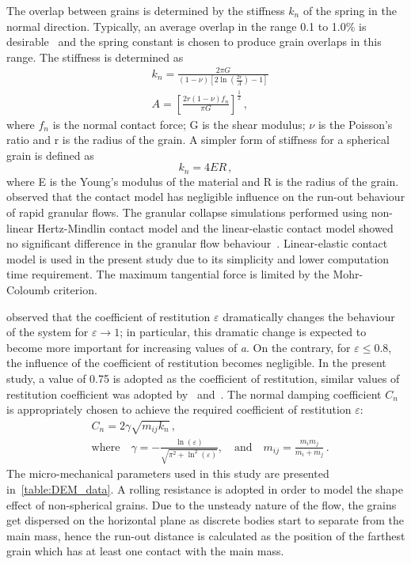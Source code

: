 The overlap between grains is determined by the stiffness 
$\textit{k}_{\textit{n}}$ of the spring in the normal direction. Typically, 
an average overlap in the range 0.1 to 1.0\% is desirable~\citep{Zenit2005} and 
the spring constant is chosen to produce grain overlaps in this range. The 
stiffness is determined as
\begin{align}
& \textit{k}_{\textit{n}}=\frac{2 \pi 
G}{(1-\nu)\left[2\ln(\frac{2r}{A})-1\right]} \\ 
& A = \left[\frac{2r(1-\nu)f_{n}}{\pi G}\right]^{\frac{1	}{2}}\,,
\end{align}
where $f_{n}$ is the normal contact force; G is the shear modulus; $\nu$ is the 
Poisson's ratio and r is the radius of the grain. A simpler form of stiffness 
for a spherical grain is defined as
\begin{equation}
\textit{k}_{\textit{n}}=4ER\,,
\end{equation}
where E is the Young's modulus of the material and R is the radius of the 
grain.~\citet{Cambou2009} observed that the contact model has negligible 
influence on the run-out behaviour of rapid granular flows. The granular 
collapse simulations performed using non-linear Hertz-Mindlin contact model and 
the linear-elastic contact model showed no significant difference in the 
granular flow behaviour~\citep{Utili2014}. Linear-elastic contact model is used 
in the present study due to its simplicity and lower computation time 
requirement. The maximum tangential force is limited by the Mohr-Coloumb 
criterion. 


\citet{Staron2007a} observed that the coefficient of restitution $\varepsilon$ 
dramatically changes the behaviour of the system for 
$\varepsilon\rightarrow 1$; in particular, this dramatic change is expected 
to become more important for increasing values of \textit{a}. On the contrary, 
for $\varepsilon \le 0.8$, the influence of the coefficient of restitution 
becomes 
negligible. In the present study, a value of 0.75 is adopted as the coefficient 
of restitution, similar values of restitution coefficient was adopted 
by~\citet{Girolami} and~\citet{Zenit2005}. The normal damping coefficient 
$C_{\textit{n}}$ 
is appropriately chosen to achieve the required coefficient of restitution 
$\varepsilon$:
\begin{align}
& C_{\textit{n}}=2\gamma \sqrt{m_{\textit{ij}}k_{\textit{n}}} \,,\\ 
& \mbox{where} \quad \gamma = -\frac{\ln(\varepsilon)}{\sqrt{\pi^{2}+\ln^2 
(\varepsilon)}},\quad \mbox{and} \quad 
\textit{m}_{\textit{ij}}=\frac{\textit{m}_{\textit{i}}\textit{m}_{\textit{j}}}{\textit{m}_{\textit{i}}
 + \textit{m}_{\textit{j}}} \,.
\end{align}
%
The micro-mechanical parameters used in this study are presented 
in~\cref{table:DEM_data}. A rolling resistance is adopted in order to 
model the shape effect of non-spherical grains. Due to the unsteady nature of 
the flow, the grains get dispersed on the horizontal plane as discrete bodies 
start to separate from the main mass, hence the run-out distance is calculated 
as the position of the farthest grain which has at least one contact with the 
main mass.
%

